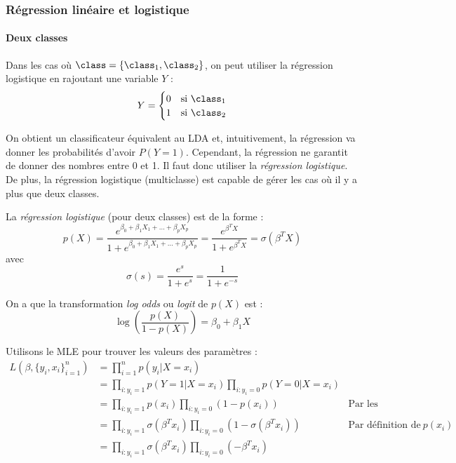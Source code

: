     \subsubsection{Régression linéaire et logistique}
        \paragraph{Deux classes}
        Dans les cas où \(\class = \{\class_1, \class_2\}\), on peut utiliser la régression logistique en rajoutant une variable \(Y\) :
        \[
            Y = \begin{cases}
                0 & \text{si } \class_1\\
                1 & \text{si } \class_2
            \end{cases}
        \]

        On obtient un classificateur équivalent au LDA et, intuitivement, la régression va donner les probabilités d'avoir \(P(Y = 1)\). Cependant, la régression ne garantit de donner des nombres entre 0 et 1. Il faut donc utiliser la \textit{régression logistique}. De plus, la régression logistique (multiclasse) est capable de gérer les cas où il y a plus que deux classes.

        \begin{definition}
            La \textit{régression logistique} (pour deux classes) est de la forme :
            \[
                p(X) = \frac{e^{\beta_0 + \beta_1 X_1 + \dots + \beta_pX_p}}{1 + e^{\beta_0 + \beta_1X_1 + \dots + \beta_pX_p}} = \frac{e^{\beta^TX}}{1 + e^{\beta^TX}} = \sigma(\beta^TX)
            \] 
            avec \[\sigma(s) = \frac{e^s}{1+e^s} = \frac{1}{1 + e^{-s}}\]

            On a que la transformation \textit{log odds} ou \textit{logit} de \(p(X)\) est :
            \[
                \log\left(\frac{p(X)}{1 - p(X)}\right) = \beta_0 + \beta_1X
            \]
        \end{definition}

        Utilisons le MLE pour trouver les valeurs des paramètres :
        \begin{align*}
            L(\beta, \{y_i, x_i\}_{i=1}^n) &= \prod_{i=1}^n p(y_i | X = x_i)\\
            &= \prod_{i:y_i = 1} p(Y = 1|X = x_i) \prod_{i:y_i=0} p(Y = 0 | X = x_i)\\
            &= \prod_{i:y_i = 1} p(x_i) \prod_{i:y_i = 0} (1 - p(x_i)) & \text{Par les probabilités}\\
            &= \prod_{i:y_i = 1} \sigma(\beta^T x_i) \prod_{i:y_i=0} (1 - \sigma(\beta^T x_i)) & \text{Par définition de } p(x_i)\\
            &= \prod_{i:y_i = 1} \sigma(\beta^T x_i) \prod_{i:y_i=0} (-\beta^T x_i)
        \end{align*}

